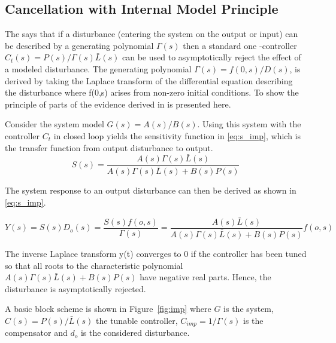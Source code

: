 \subsection{Cancellation with Internal Model Principle}
The \abbrIMP says that if a disturbance (entering the system on the output or input) can be described by a generating polynomial $\Gamma(s)$ then a standard one \abbrDOF-controller $C_{t}(s) = P(s)/\Gamma(s)\bar{L}(s)$ can be used to asymptotically reject the effect of a modeled disturbance.  The generating polynomial $\Gamma(s) = f(0,s)/D(s)$, is derived by taking the Laplace transform of the differential equation describing the disturbance where f(0,s) arises from non-zero initial conditions. To show the principle of \abbrIMP parts of the evidence derived in \citep{IMP:Perry} is presented here.

Consider the system model $G(s) = A(s)/B(s)$. Using this system with the controller $C_t$ in closed loop yields the sensitivity function in \eqref{eq:s_imp}, which is the transfer function from output disturbance to output.
\begin{equation}
  \label{eq:s_imp}
  S(s) = \frac{A(s)\Gamma(s)\bar{L}(s)}{A(s)\Gamma(s)\bar{L}(s) + B(s)P(s)}
\end{equation}

The system response to an output disturbance can then be derived as shown in \eqref{eq:s_imp}.

\begin{equation}
  \label{eq:y_imp}
  Y(s) = S(s)D_o(s) = \frac{S(s)f(o,s)}{\Gamma(s)} = \frac{A(s)\bar{L}(s)}{A(s)\Gamma(s)\bar{L}(s) + B(s)P(s)}f(o,s)
\end{equation}

The inverse Laplace transform y(t) converges to 0 if the controller has been tuned so that all roots to the characteristic polynomial $A(s)\Gamma(s)\bar{L}(s) + B(s)P(s)$ have negative real parts. Hence, the disturbance is asymptotically rejected.

A basic block scheme is shown in Figure~\ref{fig:imp} where $G$ is the system, $C(s) = P(s)/\bar{L}(s)$ the tunable controller, $C_{imp} = 1/\Gamma(s)$ is the compensator and $d_o$ is the considered disturbance.

